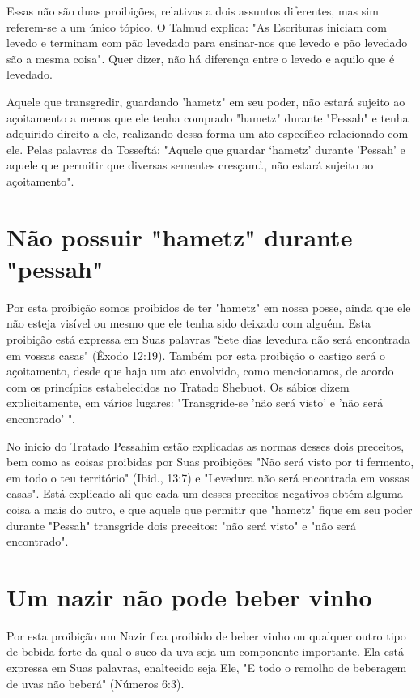 \begin{itemize}
\begin{enumrate}
\begin{itemize}
\begin{itemize}
\begin{itemize}
Essas não são duas proibições, relativas a dois assuntos diferentes, mas
sim referem-se a um único tópico. O Talmud explica: "As Escrituras
ini­ciam com levedo e terminam com pão levedado para ensinar-nos que
levedo e pão levedado são a mesma coisa". Quer dizer, não há diferença
entre o leve­do e aquilo que é levedado.

Aquele que transgredir, guardando 'hametz" em seu poder, não es­tará
sujeito ao açoitamento a menos que ele tenha comprado "hametz" duran­te
"Pessah" e tenha adquirido direito a ele, realizando dessa forma um ato
es­pecífico relacionado com ele. Pelas palavras da Tosseftá: "Aquele que
guardar `hametz' durante 'Pessah' e aquele que permitir que diversas
sementes cresçam.'., não estará
sujeito ao açoitamento".


\section{Não possuir "hametz" durante "pessah"}

Por esta proibição somos proibidos de ter "hametz" em nossa pos­se,
ainda que ele não esteja visível ou mesmo que ele tenha sido deixado com
alguém. Esta proibição está expressa em Suas palavras "Sete dias
levedura não será encontrada em vossas casas" (Êxodo 12:19). Também por
esta proibição o castigo será o açoitamento, desde que haja um ato
envolvido, como mencio­namos, de acordo com os princípios estabelecidos
no Tratado Shebuot. Os sá­bios dizem explicitamente, em vários lugares:
"Transgride-se 'não será visto' e 'não será encontrado' ".

No início do Tratado Pessahim estão explicadas as normas desses dois
preceitos, bem como as coisas proibidas por Suas proibições "Não será
visto por ti fermento, em todo o teu território" (Ibid., 13:7) e
"Levedura não será encontrada em vossas casas". Está explicado ali que
cada um desses preceitos negativos obtém alguma coisa a mais do outro, e
que aquele que permitir que "hametz" fique em seu poder durante "Pessah"
transgride dois preceitos: "não será visto" e "não será encontrado".


\section{Um nazir não pode beber vinho}


Por esta proibição um Nazir fica proibido de beber vinho ou qual­quer
outro tipo de bebida forte da qual o suco da uva seja um componente
importante. Ela está expressa em Suas palavras, enaltecido seja Ele, "E
todo o remolho de beberagem de uvas não beberá" (Números 6:3).



\end{itemize}
\end{itemize}
\end{itemize}
\end{enumrate}
\end{itemize}

